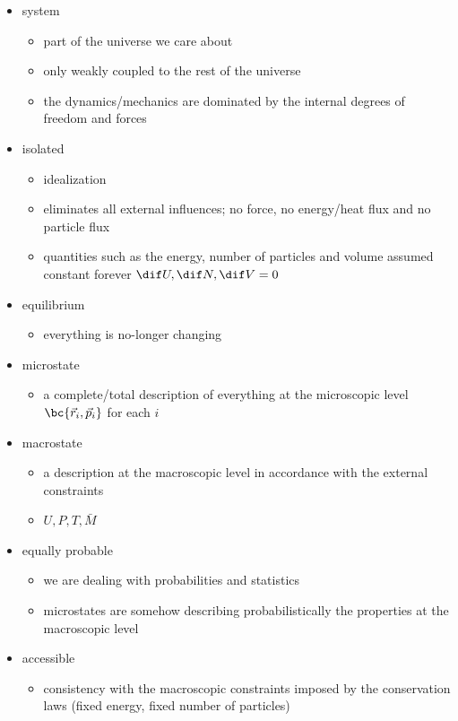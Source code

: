 \documentclass{article}
\begin{document}
\begin{itemize}
        \item system
        \begin{itemize}
                \item part of the universe we care about
                \item only weakly coupled to the rest of the universe
                \item the dynamics/mechanics are dominated by the internal degrees of freedom and forces
        \end{itemize}
        \item isolated
        \begin{itemize}
                \item idealization
                \item eliminates all external influences; no force, no energy/heat flux and no particle flux
                \item quantities such as the energy, number of particles and volume assumed constant forever $\dif U, \dif N, \dif V = 0$
        \end{itemize}
        \item equilibrium
        \begin{itemize}
                \item everything is no-longer changing
        \end{itemize}
        \item microstate
        \begin{itemize}
                \item a complete/total description of everything at the microscopic level $\bc{\vec{r}_i, \vec{p}_i}$ for each $i$
        \end{itemize}
        \item macrostate
        \begin{itemize}
                \item a description at the macroscopic level in accordance with the external constraints
                \item $U, P, T, \bar{M}$
        \end{itemize}
        \item equally probable
        \begin{itemize}
                \item we are dealing with probabilities and statistics
                \item microstates are somehow describing probabilistically the properties at the macroscopic level
        \end{itemize}
        \item accessible
        \begin{itemize}
                \item consistency with the macroscopic constraints imposed by the conservation laws (fixed energy, fixed number of particles)
        \end{itemize}
\end{itemize}
\end{document}
